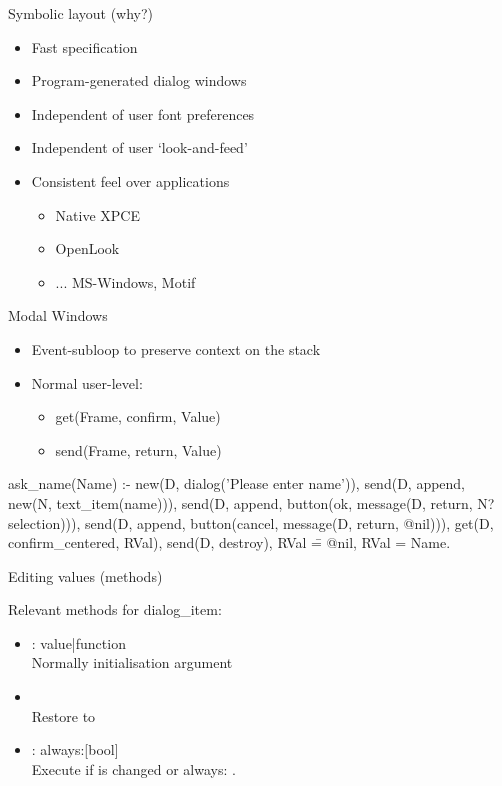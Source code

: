 \begin{sli}{Symbolic layout (why?)}
\begin{itemize}
    \item Fast specification
    \item Program-generated dialog windows
    \item Independent of user font preferences
    \item Independent of user `look-and-feed'
    \item Consistent feel over applications
    \begin{itemize}
        \item Native XPCE
	\item OpenLook
	\item ... MS-Windows, Motif
    \end{itemize}
\end{itemize}
\end{sli}


\begin{sli}{Modal Windows}

\begin{itemize}
    \item Event-subloop to preserve context on the stack
    \item Normal user-level:
    \begin{itemize}
        \item get(Frame, confirm, Value)
	\item send(Frame, return, Value)
    \end{itemize}
\end{itemize}

\begin{code}
ask_name(Name) :-
        new(D, dialog('Please enter name')),
        send(D, append, new(N, text_item(name))),
        send(D, append,
             button(ok, message(D, return,
                                N?selection))),
        send(D, append,
             button(cancel, message(D, return, @nil))),
        get(D, confirm_centered, RVal),
        send(D, destroy),
        RVal \== @nil,
        RVal = Name.
\end{code}

\noindent
\end{sli}


\begin{sli}{Editing values (methods)}

Relevant methods for dialog_item:

\begin{itemize}
    \item {}: value|function\hfill\\
    	  Normally initialisation argument
    \item {}\hfill\\
    	  Restore  to 
    \item {}: always:[bool]\hfill\\
    	  Execute  if  is changed or always: .
\end{itemize}
\end{sli}



